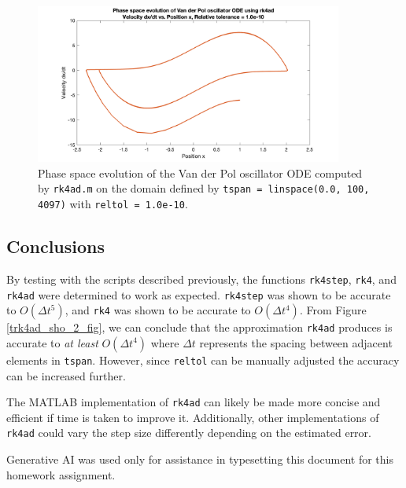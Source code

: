 \documentclass[10pt]{article}
\def\code#1{\texttt{#1}} %
\begin{document}
\begin{figure}[H]
\centering
\includegraphics[width=0.9\textwidth]{trk4ad_vdp_2.png}
\caption{Phase space evolution of the Van der Pol oscillator ODE computed by \code{rk4ad.m} on the domain
defined by \code{tspan = linspace(0.0, 100, 4097)} with \code{reltol = 1.0e-10}.}
\label{trk4ad_vdp_2_fig}
\end{figure}

\subsection*{Conclusions}

By testing with the scripts described previously, the functions \code{rk4step}, \code{rk4}, and 
\code{rk4ad} were determined to work as expected. \code{rk4step} was shown to be accurate
to $O(\Delta t^5)$, and \code{rk4} was shown to be accurate to $O(\Delta t^4)$. From Figure 
\ref{trk4ad_sho_2_fig}, we can conclude that the approximation \code{rk4ad} produces is accurate to 
\textit{at least} $O(\Delta t^4)$ where $\Delta t$ represents the spacing between adjacent elements in 
\code{tspan}. However, since \code{reltol} can be manually adjusted the accuracy can be increased 
further. 

The MATLAB implementation of \code{rk4ad} can likely be made more concise and efficient if time is taken 
to improve it. Additionally, other implementations of \code{rk4ad} could vary the step size differently 
depending on the estimated error. 

Generative AI was used only for assistance in typesetting this document for this homework assignment. 

\pagebreak
\end{document}
